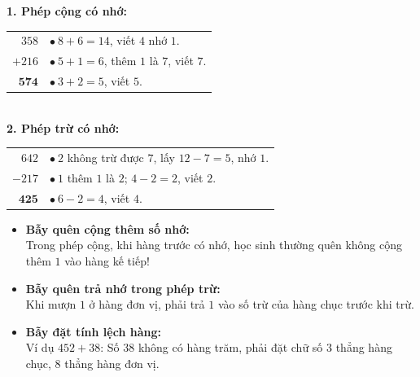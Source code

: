 \documentclass[12pt,a4paper]{article}
\begin{document}
\vspace{-2.5mm}
\noindent
\begin{minipage}[t]{0.49\textwidth}\vspace{0pt}
\begin{tcolorbox}[
  enhanced,
  colback=green!4!white,
  colframe=green!60!black,
  arc=2mm, boxrule=0.8pt,
  left=2mm, right=2mm, top=1.8mm, bottom=1.8mm,
  title={\footnotesize\bfseries\color{white}\faCheckCircle\ Ví dụ thực hành chuẩn mực}
]
{\footnotesize
\textbf{1. Phép cộng có nhớ:}\\
\begin{tabular}{r@{\quad}l}
  $358$ & $\bullet\ 8 + 6 = 14$, viết $4$ nhớ $1$.\\
$+ 216$ & $\bullet\ 5 + 1 = 6$, thêm $1$ là $7$, viết $7$.\\
\cline{1-1}
  $\mathbf{574}$ & $\bullet\ 3 + 2 = 5$, viết $5$.
\end{tabular}\\[1mm]
\textbf{2. Phép trừ có nhớ:}\\
\begin{tabular}{r@{\quad}l}
  $642$ & $\bullet\ 2$ không trừ được $7$, lấy $12 - 7 = 5$, nhớ $1$.\\
$- 217$ & $\bullet\ 1$ thêm $1$ là $2$; $4 - 2 = 2$, viết $2$.\\
\cline{1-1}
  $\mathbf{425}$ & $\bullet\ 6 - 2 = 4$, viết $4$.
\end{tabular}
}
\end{tcolorbox}
\end{minipage}
\hfill
\begin{minipage}[t]{0.49\textwidth}\vspace{0pt}
\begin{tcolorbox}[
  enhanced,
  colback=red!4!white,
  colframe=red!70!black,
  arc=2mm, boxrule=0.8pt,
  left=2mm, right=2mm, top=1.8mm, bottom=1.8mm,
  title={\footnotesize\bfseries\color{white}\faExclamationTriangle\ Mẹo tránh bẫy trắc nghiệm}
]
{\footnotesize
\begin{itemize}\setlength{\itemsep}{1.5pt}\setlength{\leftskip}{-2.5mm}
  \item \textbf{Bẫy quên cộng thêm số nhớ:}\\
  Trong phép cộng, khi hàng trước có nhớ, học sinh thường quên không cộng thêm $1$ vào hàng kế tiếp!
  \item \textbf{Bẫy quên trả nhớ trong phép trừ:}\\
  Khi mượn $1$ ở hàng đơn vị, phải trả $1$ vào số trừ của hàng chục trước khi trừ.
  \item \textbf{Bẫy đặt tính lệch hàng:}\\
  Ví dụ $452 + 38$: Số $38$ không có hàng trăm, phải đặt chữ số $3$ thẳng hàng chục, $8$ thẳng hàng đơn vị.
\end{itemize}
}
\end{tcolorbox}
\end{minipage}
\end{document}
